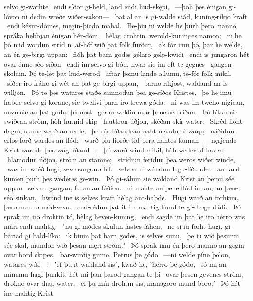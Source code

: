 selvo gi-warhte \hld\ endi síðor gi-held,
land endi liud-skępi, \hld\ —þoh þes énigan gi-lóvon ni dedin
wréðe wiðer-sakon— \hld\ þat al an is gi-walde stád,
kuning-ríkjo kraft \hld\ endi késur-dómes,
męgin-þiodo mahal. \hld\ Be-þiu ni welde he þurh þero manno spráka
hębbjan énigan hér-dóm, \hld\ hèlag drohtin,
werold-kuninges namon; \hld\ ni he þó mid wordun stríd
ni af-hóf wið þat folk furður, \hld\ ak fór imu þó, þar he welde,
an én ge-birgi uppan: \hld\ flóh þat barn godes
gélaro gelp-kwidi \hld\ endi is jungaron hét
ovar énne séo síðon \hld\ endi im selvo gi-bód,
hwar sie im eft te-gegnes \hld\ gangen skoldin.
Þó te-lét þat liud-werod \hld\ aftar þemu lande allumu,
te-fór folk mikil, \hld\ síðor iro fráho gi-wét
an þat ge-birgi uppan, \hld\ barno ríkjost,
waldand an is willjon. \hld\ Þó te þes watares staðe
samnodun þea ge-síðos Kristes, \hld\ þe he imu habde selvo gi-korane,
sie twelivi þurh iro trewa góda: \hld\ ni was im tweho nigiean,
nevu sie an þat godes þionost \hld\ gerno weldin
ovar þene séo síðon. \hld\ Þó létun sie swíðean stròm,
hòh hurnid-skip \hld\ hluttron úðjon,
skéðan skír water. \hld\ Skréd lioht dages,
sunne warð an sedle; \hld\ þe séo-líðandean
naht nevulo bi-warp; \hld\ náðidun erlos
forð-wardes an flód; \hld\ warð þiu fiorðe tid
þera nahtes kuman \hld\ —nęrjendo Krist
warode þea wág-líðand—: \hld\ þó warð wind mikil,
hòh weder af-haven: \hld\ hlamodun úðjon,
stròm an stamne; \hld\ strídiun feridun
þea weros wiðer winde, \hld\ was im wréð hugi,
sevo sorgono ful: \hld\ selvon ni wándun
lagu-líðandea \hld\ an land kumen
þurh þes wederes ge-win. \hld\ Þó gi-sáhun sie waldand Krist
an þemu sée uppan \hld\ selvun gangan,
faran an fáðion: \hld\ ni mahte an þene flód innan,
an þene séo sinkan, \hld\ hwand ine is selves kraft
hèlag ant-habde. \hld\ Hugi warð an forhtun,
þero manno mód-sevo: \hld\ and-rédun þat it im mahtig fíund
te gi-droge dádi. \hld\ Þó sprak im iro drohtin tó,
hèlag heven-kuning, \hld\ endi sagde im þat he iro hérro was
mári endi mahtig: \hld\ ʽnu gi módes skulun
fastes fáhen; \hld\ ne sí iu forht hugi,
gi-báriad gi bald-líko: \hld\ ik bium þat barn godes,
is selves sunu, \hld\ þe iu wið þesumu sée skal,
mundon wið þesan męri-stròm.ʼ \hld\ Þó sprak imu én þero manno an-gegin
ovar bord skipes, \hld\ bar-wirðig gumo,
Petrus þe gódo \hld\ —ni welde píne þolon,
watares wíti—: \hld\ ʽef þu it waldand sísʼ, kwað he,
ʽhérro þe gódo, \hld\ só mi an mínumu hugi þunkit,
hét mi þan þarod gangan te þi \hld\ ovar þesen gevenes stròm,
drokno ovar diap water, \hld\ ef þu mín drohtin sís,
managoro mund-boro.ʼ \hld\ Þó hét ine mahtig Krist
